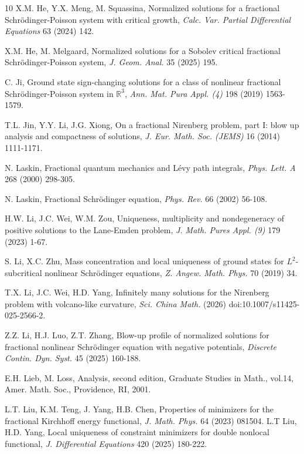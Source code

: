 \documentclass[reqno, 11pt]{amsart} %
\numberwithin{equation}{section}
\begin{document}
\begin{thebibliography}{10}
		X.M. He, Y.X. Meng, M. Squassina,
		Normalized solutions for a fractional Schr\"{o}dinger-Poisson system with critical growth,
		{\em Calc. Var. Partial Differential Equations} 63 (2024) 142.
		
		X.M. He, M. Melgaard,
		Normalized solutions for a Sobolev critical fractional Schr\"{o}dinger-Poisson system,
		{\em J. Geom. Anal.} 35 (2025) 195.
		
		C. Ji,
		Ground state sign-changing solutions for a class of nonlinear fractional Schr\"{o}dinger-Poisson system in $\mathbb{R}^{3}$,
		{\em Ann. Mat. Pura Appl. (4)} 198 (2019) 1563-1579.
		
		T.L. Jin, Y.Y. Li, J.G. Xiong,
		On a fractional Nirenberg problem, part I: blow up analysis and compactness of solutions, {\em J. Eur. Math. Soc. (JEMS)} 16 (2014) 1111-1171.
		
		N. Laskin,
		Fractional quantum mechanics and L\'{e}vy path integrals, {\em Phys. Lett. A} 268 (2000) 298-305.
		
		N. Laskin,
		Fractional Schr\"{o}dinger equation, {\em Phys. Rev.} 66 (2002) 56-108.
		
		H.W. Li, J.C. Wei, W.M. Zou,
		Uniqueness, multiplicity and nondegeneracy of positive solutions to the Lane-Emden problem,
		{\em J. Math. Pures Appl. (9)} 179 (2023) 1-67.
		
		
		S. Li, X.C. Zhu,
		Mass concentration and local uniqueness of ground states for $L^{2}$-subcritical nonlinear Schr\"{o}dinger equations,
		{\em Z. Angew. Math. Phys.} 70 (2019) 34.
		
		 T.X. Li, J.C. Wei, H.D. Yang, Infinitely many solutions for the Nirenberg problem with volcano-like curvature, {\em Sci. China Math.} (2026) doi:10.1007/s11425-025-2566-2.
		
		Z.Z. Li, H.J. Luo, Z.T. Zhang,
		Blow-up profile of normalized solutions for fractional nonlinear Schr\"{o}dinger equation with negative potentials,
		{\em Discrete Contin. Dyn. Syst.} 45 (2025) 160-188.
		
		
		
		E.H. Lieb, M. Loss, Analysis, second edition, Graduate Studies in Math., vol.14, Amer. Math. Soc., Providence, RI, 2001.
		
		L.T. Liu, K.M. Teng, J. Yang, H.B. Chen,
		Properties of minimizers for the fractional Kirchhoff energy functional, {\em J. Math. Phys.} 64 (2023) 081504.
		 L.T Liu, H.D. Yang,
		Local uniqueness of constraint minimizers for double nonlocal functional,
		{\em J. Differential Equations} 420 (2025) 180-222.
		

\end{thebibliography}
\end{document}
